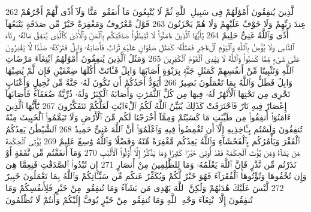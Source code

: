 {\tiny\colorbox{cl_aya}{262}} ٱلَّذِينَ يُنفِقُونَ أَمْوَٰلَهُمْ فِى سَبِيلِ ٱللَّهِ ثُمَّ لَا يُتْبِعُونَ مَآ أَنفَقُوا۟ مَنًّا وَلَآ أَذًى لَّهُمْ أَجْرُهُمْ عِندَ رَبِّهِمْ وَلَا خَوْفٌ عَلَيْهِمْ وَلَا هُمْ يَحْزَنُونَ
{\tiny\colorbox{cl_aya}{263}} قَوْلٌ مَّعْرُوفٌ وَمَغْفِرَةٌ خَيْرٌ مِّن صَدَقَةٍ يَتْبَعُهَآ أَذًى وَٱللَّهُ غَنِىٌّ حَلِيمٌ
{\tiny\colorbox{cl_aya}{264}} يَٰٓأَيُّهَا ٱلَّذِينَ ءَامَنُوا۟ لَا تُبْطِلُوا۟ صَدَقَٰتِكُم بِٱلْمَنِّ وَٱلْأَذَىٰ كَٱلَّذِى يُنفِقُ مَالَهُۥ رِئَآءَ ٱلنَّاسِ وَلَا يُؤْمِنُ بِٱللَّهِ وَٱلْيَوْمِ ٱلْءَاخِرِ فَمَثَلُهُۥ كَمَثَلِ صَفْوَانٍ عَلَيْهِ تُرَابٌ فَأَصَابَهُۥ وَابِلٌ فَتَرَكَهُۥ صَلْدًا لَّا يَقْدِرُونَ عَلَىٰ شَىْءٍ مِّمَّا كَسَبُوا۟ وَٱللَّهُ لَا يَهْدِى ٱلْقَوْمَ ٱلْكَٰفِرِينَ
{\tiny\colorbox{cl_aya}{265}} وَمَثَلُ ٱلَّذِينَ يُنفِقُونَ أَمْوَٰلَهُمُ ٱبْتِغَآءَ مَرْضَاتِ ٱللَّهِ وَتَثْبِيتًا مِّنْ أَنفُسِهِمْ كَمَثَلِ جَنَّةٍۭ بِرَبْوَةٍ أَصَابَهَا وَابِلٌ فَـَٔاتَتْ أُكُلَهَا ضِعْفَيْنِ فَإِن لَّمْ يُصِبْهَا وَابِلٌ فَطَلٌّ وَٱللَّهُ بِمَا تَعْمَلُونَ بَصِيرٌ
{\tiny\colorbox{cl_aya}{266}} أَيَوَدُّ أَحَدُكُمْ أَن تَكُونَ لَهُۥ جَنَّةٌ مِّن نَّخِيلٍ وَأَعْنَابٍ تَجْرِى مِن تَحْتِهَا ٱلْأَنْهَٰرُ لَهُۥ فِيهَا مِن كُلِّ ٱلثَّمَرَٰتِ وَأَصَابَهُ ٱلْكِبَرُ وَلَهُۥ ذُرِّيَّةٌ ضُعَفَآءُ فَأَصَابَهَآ إِعْصَارٌ فِيهِ نَارٌ فَٱحْتَرَقَتْ كَذَٰلِكَ يُبَيِّنُ ٱللَّهُ لَكُمُ ٱلْءَايَٰتِ لَعَلَّكُمْ تَتَفَكَّرُونَ
{\tiny\colorbox{cl_aya}{267}} يَٰٓأَيُّهَا ٱلَّذِينَ ءَامَنُوٓا۟ أَنفِقُوا۟ مِن طَيِّبَٰتِ مَا كَسَبْتُمْ وَمِمَّآ أَخْرَجْنَا لَكُم مِّنَ ٱلْأَرْضِ وَلَا تَيَمَّمُوا۟ ٱلْخَبِيثَ مِنْهُ تُنفِقُونَ وَلَسْتُم بِـَٔاخِذِيهِ إِلَّآ أَن تُغْمِضُوا۟ فِيهِ وَٱعْلَمُوٓا۟ أَنَّ ٱللَّهَ غَنِىٌّ حَمِيدٌ
{\tiny\colorbox{cl_aya}{268}} ٱلشَّيْطَٰنُ يَعِدُكُمُ ٱلْفَقْرَ وَيَأْمُرُكُم بِٱلْفَحْشَآءِ وَٱللَّهُ يَعِدُكُم مَّغْفِرَةً مِّنْهُ وَفَضْلًا وَٱللَّهُ وَٰسِعٌ عَلِيمٌ
{\tiny\colorbox{cl_aya}{269}} يُؤْتِى ٱلْحِكْمَةَ مَن يَشَآءُ وَمَن يُؤْتَ ٱلْحِكْمَةَ فَقَدْ أُوتِىَ خَيْرًا كَثِيرًا وَمَا يَذَّكَّرُ إِلَّآ أُو۟لُوا۟ ٱلْأَلْبَٰبِ
{\tiny\colorbox{cl_aya}{270}} وَمَآ أَنفَقْتُم مِّن نَّفَقَةٍ أَوْ نَذَرْتُم مِّن نَّذْرٍ فَإِنَّ ٱللَّهَ يَعْلَمُهُۥ وَمَا لِلظَّٰلِمِينَ مِنْ أَنصَارٍ
{\tiny\colorbox{cl_aya}{271}} إِن تُبْدُوا۟ ٱلصَّدَقَٰتِ فَنِعِمَّا هِىَ وَإِن تُخْفُوهَا وَتُؤْتُوهَا ٱلْفُقَرَآءَ فَهُوَ خَيْرٌ لَّكُمْ وَيُكَفِّرُ عَنكُم مِّن سَيِّـَٔاتِكُمْ وَٱللَّهُ بِمَا تَعْمَلُونَ خَبِيرٌ
{\tiny\colorbox{cl_aya}{272}} لَّيْسَ عَلَيْكَ هُدَىٰهُمْ وَلَٰكِنَّ ٱللَّهَ يَهْدِى مَن يَشَآءُ وَمَا تُنفِقُوا۟ مِنْ خَيْرٍ فَلِأَنفُسِكُمْ وَمَا تُنفِقُونَ إِلَّا ٱبْتِغَآءَ وَجْهِ ٱللَّهِ وَمَا تُنفِقُوا۟ مِنْ خَيْرٍ يُوَفَّ إِلَيْكُمْ وَأَنتُمْ لَا تُظْلَمُونَ

